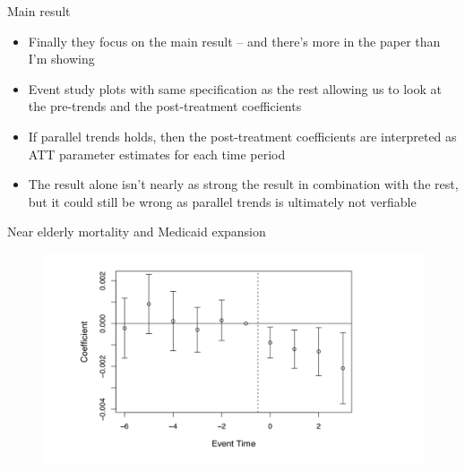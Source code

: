 \documentclass{beamer}
\begin{document}
\begin{frame}{Main result}

\begin{itemize}

\item Finally they focus on the main result -- and there's more in the paper than I'm showing
\item Event study plots with same specification as the rest allowing us to look at the pre-trends and the post-treatment coefficients
\item If parallel trends holds, then the post-treatment coefficients are interpreted as ATT parameter estimates for each time period
\item The result alone isn't nearly as strong the result in combination with the rest, but it could still be wrong as parallel trends is ultimately not verfiable
\end{itemize}

\end{frame}



\begin{frame}{Near elderly mortality and Medicaid expansion}

	\begin{figure}
	\includegraphics[scale=0.3]{./lecture_includes/Miller_Medicaid4.png}
	\end{figure}

\end{frame}
\end{document}
